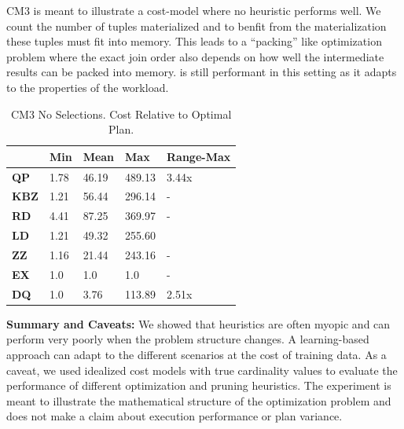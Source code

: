 CM3 is meant to illustrate a cost-model where no heuristic performs well. We count the number of tuples materialized and to benfit from the materialization these tuples must fit into memory. This leads to a ``packing'' like optimization problem where the exact join order also depends on how well the intermediate results can be packed into memory. \sys is still performant in this setting as it adapts to the properties of the workload.

\begin{table}[ht!]\centering \small
\caption{\small{CM3 No Selections. Cost Relative to Optimal Plan.}}\vspace{0.25em}
\begin{tabular}{|l|l|l|l|l|}
\hline
    & {\bf Min}  & {\bf Mean}  & {\bf Max}    & {\bf Range-Max} \\ \hline
{\bf QP}  & 1.78  & 46.19 & 489.13 & 3.44x      \\ \hline
{\bf KBZ} & 1.21  & 56.44  & 296.14  & -         \\ \hline
{\bf RD}  & 4.41 & 87.25 & 369.97 & -         \\ \hline
{\bf LD}  & 1.21  & 49.32   & 255.60    &           \\ \hline
{\bf ZZ}  & 1.16  & 21.44   & 243.16    & -         \\ \hline
{\bf EX}  & 1.0  & 1.0   & 1.0    & -         \\ \hline
\hline
{\bf DQ}  & 1.0  & 3.76   & 113.89    & 2.51x\\ \hline
\end{tabular}
\end{table}

\vspace{0.5em}\noindent \textbf{Summary and Caveats: }  We showed that heuristics are often myopic and can perform very poorly when the problem structure changes. A learning-based approach can adapt to the different scenarios at the cost of training data. As a caveat, we used idealized cost models with true cardinality values to evaluate the performance of different optimization and pruning heuristics. The experiment is meant to illustrate the mathematical structure of the optimization problem and does not make a claim about execution performance or plan variance.

